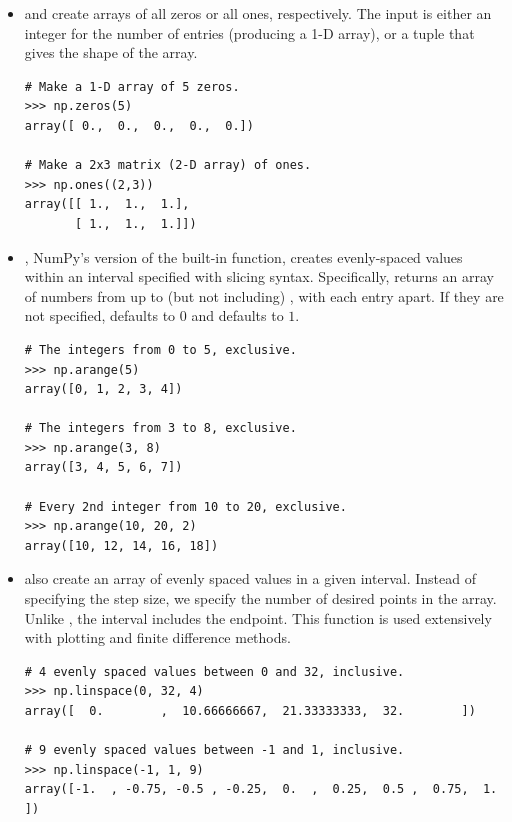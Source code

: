 \begin{itemize}

\item {} and  create arrays of all zeros or all ones, respectively.
The input is either an integer for the number of entries (producing a 1-D array), or a tuple that gives the shape of the array.
\begin{lstlisting}
# Make a 1-D array of 5 zeros.
>>> np.zeros(5)
array([ 0.,  0.,  0.,  0.,  0.])

# Make a 2x3 matrix (2-D array) of ones.
>>> np.ones((2,3))
array([[ 1.,  1.,  1.],
       [ 1.,  1.,  1.]])
\end{lstlisting}

\item {}, NumPy's version of the built-in  function, creates evenly-spaced values within an interval specified with slicing syntax.
Specifically,  returns an array of numbers from  up to (but not including) , with each entry  apart.
If they are not specified,  defaults to $0$ and  defaults to $1$.

\begin{lstlisting}
# The integers from 0 to 5, exclusive.
>>> np.arange(5)
array([0, 1, 2, 3, 4])

# The integers from 3 to 8, exclusive.
>>> np.arange(3, 8)
array([3, 4, 5, 6, 7])

# Every 2nd integer from 10 to 20, exclusive.
>>> np.arange(10, 20, 2)
array([10, 12, 14, 16, 18])
\end{lstlisting}

\item {} also create an array of evenly spaced values in a given interval.
Instead of specifying the step size, we specify the number of desired points in the array.
Unlike , the interval includes the endpoint.
This function is used extensively with plotting and finite difference methods.

\begin{lstlisting}
# 4 evenly spaced values between 0 and 32, inclusive.
>>> np.linspace(0, 32, 4) 
array([  0.        ,  10.66666667,  21.33333333,  32.        ])

# 9 evenly spaced values between -1 and 1, inclusive.
>>> np.linspace(-1, 1, 9)
array([-1.  , -0.75, -0.5 , -0.25,  0.  ,  0.25,  0.5 ,  0.75,  1.  ])
\end{lstlisting} 


\end{itemize}
